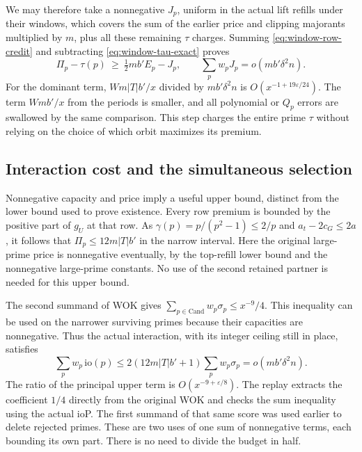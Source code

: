 \documentclass[12pt,letterpaper]{article}
\DeclareRobustCommand{\id}[1]{\mbox{\small\ttfamily #1}}
\begin{document}
We may therefore take a nonnegative \(J_p\), uniform in the actual lift refills under their windows, which covers the sum of the earlier price and clipping majorants multiplied by \(m\), plus all these remaining \(\tau\) charges. Summing \eqref{eq:window-row-credit} and subtracting \eqref{eq:window-tau-exact} proves
\[
             \Pi_p-\tau(p)\ \ge\ \tfrac12 m b'E_p-J_p,
       \qquad
             \sum_p w_p J_p=o(m b'\delta^2 n).
\]
For the dominant term, \(W m |T|b'/x\) divided by \(m b'\delta^2 n\) is \(O(x^{-1+19\varepsilon/24})\). The term \(Wm b'/x\) from the periods is smaller, and all polynomial or \(Q_p\) errors are swallowed by the same comparison. This step charges the entire prime \(\tau\) without relying on the choice of which orbit maximizes its premium.

\subsection{Interaction cost and the simultaneous selection}

Nonnegative capacity and price imply a useful upper bound, distinct from the lower bound used to prove existence. Every row premium is bounded by the positive part of \(g_U\) at that row. As \(\gamma(p)=p/(p^2-1)\le2/p\) and \(a_t-2c_G\le2a\), it follows that \(\Pi_p\le12m|T|b'\) in the narrow interval. Here the original large-prime price is nonnegative eventually, by the top-refill lower bound and the nonnegative large-prime constants. No use of the second retained partner is needed for this upper bound.

The second summand of \id{WOK} gives \(\sum_{p\in\mathrm{Cand}} w_p\sigma_p\le x^{-9}/4\). This inequality can be used on the narrower surviving primes because their capacities are nonnegative. Thus the actual interaction, with its integer ceiling still in place, satisfies
\[
    \sum_p w_p\,\mathrm{io}(p)
        \le 2(12m|T|b'+1)\sum_p w_p\sigma_p
        =o(mb'\delta^2 n).
\]
The ratio of the principal upper term is \(O(x^{-9+\varepsilon/8})\). The replay extracts the coefficient \(1/4\) directly from the original \id{WOK} and checks the sum inequality using the actual \id{ioP}. The first summand of that same score was used earlier to delete rejected primes. These are two uses of one sum of nonnegative terms, each bounding its own part. There is no need to divide the budget in half.
\end{document}

